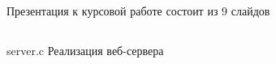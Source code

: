 \begin{appendices}
	\chapter{}
	Презентация к курсовой работе состоит из 9 слайдов
\end{appendices}
\begin{appendices}
	\chapter{}
		{server.c}
		{Реализация веб-сервера}
\end{appendices}